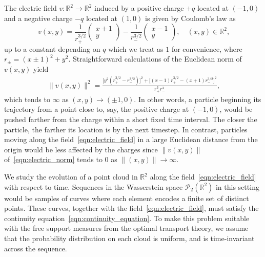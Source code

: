 \documentclass[12pt]{amsart}
\begin{document}
The electric field $v:\mathbb{R}^2\rightarrow\mathbb{R}^2$ induced by a positive charge $+q$ located at $(-1, 0)$ and a negative charge $-q$ located at $(1, 0)$ is given by Coulomb's law as
\begin{equation}~\label{eqn:electric_field}
    v(x,y) = \frac{1}{r_+^{3/2}}
    \begin{pmatrix}
        x+1 \\
        y
    \end{pmatrix}
    -\frac{1}{r_-^{3/2}}
    \begin{pmatrix}
        x-1 \\
        y
    \end{pmatrix}, \quad (x,y)\in\mathbb{R}^2,
\end{equation}
up to a constant depending on $q$ which we treat as $1$ for convenience, where $r_\pm=(x\pm1)^2+y^2$. Straightforward calculations of the Euclidean norm of $v(x,y)$ yield
\begin{align}~\label{eqn:electric_norm}
    \|v(x,y)\|^2 = \frac{\bigg[ y^2 \left(r_+ ^{3/2} - r_-^{3/2} \right)\bigg]^2+\bigg[(x - 1)r_+^{3/2} - (x + 1)r_-^{3/2}\bigg]^2
}{r_+^3 r_-^3},
\end{align}
which tends to $\infty$ as $(x,y)\rightarrow(\pm1,0)$. In other words, a particle beginning its trajectory from a point close to, say, the positive charge at $(-1, 0)$, would be pushed farther from the charge within a short fixed time interval. The closer the particle, the farther its location is by the next timestep. In contrast, particles moving along the field~\eqref{eqn:electric_field} in a large Euclidean distance from the origin would be less affected by the charges since $\|v(x,y)\|$ of~\eqref{eqn:electric_norm} tends to $0$ as $\|(x, y)\|\rightarrow\infty$.

We study the evolution of a point cloud in $\mathbb{R}^2$ along the field~\eqref{eqn:electric_field} with respect to time. Sequences in the Wasserstein space $\mathcal{P}_2(\mathbb{R}^2)$ in this setting would be samples of curves where each element encodes a finite set of distinct points. These curves, together with the field~\eqref{eqn:electric_field}, must satisfy the continuity equation~\eqref{eqn:continuity_equation}. To make this problem suitable with the free support measures from the optimal transport theory, we assume that the probability distribution on each cloud is uniform, and is time-invariant across the sequence.
\end{document}
